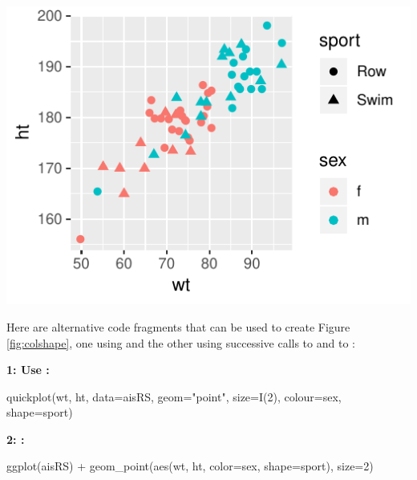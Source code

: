 \begin{marginfigure}[-72pt]
\begin{Schunk}


\centerline{\includegraphics[width=\textwidth]{figs/07-quick-rs1-1} }

\end{Schunk}
\caption{Use  for distinguishing es,
s for s.}\label{fig:colshape}

\end{marginfigure}

Here are alternative code fragments that can be used to create
Figure \ref{fig:colshape}, one using  and the other
using successive calls to  and to :
\vspace*{9pt}

\begin{fullwidth}
\begin{minipage}[t]{0.36\linewidth}
{\bf 1: Use :}
\begin{Schunk}
\begin{Sinput}
quickplot(wt, ht,
          data=aisRS,
          geom="point",
          size=I(2),
          colour=sex,
          shape=sport)
\end{Sinput}
\end{Schunk}
\end{minipage}
\hspace*{0.04\textwidth}
\begin{minipage}[t]{0.4\linewidth}
{\bf 2: :}
\begin{Schunk}
\begin{Sinput}
ggplot(aisRS) +
  geom_point(aes(wt, ht,
               color=sex,
               shape=sport),
             size=2)
\end{Sinput}
\end{Schunk}
\end{minipage}
\end{fullwidth}


